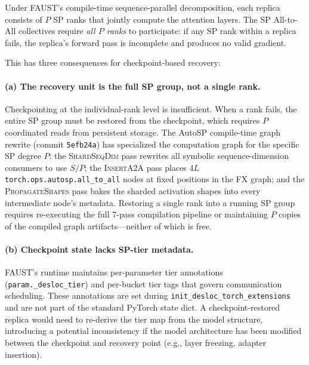 \documentclass{article}
\begin{document}
Under FAUST's compile-time sequence-parallel decomposition, each
replica consists of $P$ SP ranks that jointly compute the attention
layers. The SP All-to-All collectives require \emph{all $P$ ranks} to
participate: if any SP rank within a replica fails, the replica's
forward pass is incomplete and produces no valid gradient.

This has three consequences for checkpoint-based recovery:

\paragraph{(a) The recovery unit is the full SP group, not a single rank.}
Checkpointing at the individual-rank level is insufficient. When a rank
fails, the entire SP group must be restored from the checkpoint, which
requires $P$ coordinated reads from persistent storage. The AutoSP compile-time
graph rewrite (commit \texttt{5efb24a}) has specialized the computation graph for the specific
SP degree $P$: the \textsc{ShardSeqDim} pass rewrites all symbolic
sequence-dimension consumers to use $S/P$; the \textsc{InsertA2A} pass
places $4L$ \texttt{torch.ops.autosp.all\_to\_all} nodes at fixed
positions in the FX graph; and the \textsc{PropagateShapes} pass bakes
the sharded activation shapes into every intermediate node's metadata.
Restoring a single rank into a running SP group requires re-executing
the full 7-pass compilation pipeline or maintaining $P$ copies of
the compiled graph artifacts---neither of which is free.

\paragraph{(b) Checkpoint state lacks SP-tier metadata.}
FAUST's runtime maintains per-parameter tier annotations
(\texttt{param.\_desloc\_tier}) and per-bucket tier tags that govern
communication scheduling. These annotations are set during
\texttt{init\_desloc\_torch\_extensions} and are not part of the
standard PyTorch state dict. A checkpoint-restored replica would need
to re-derive the tier map from the model structure, introducing a
potential inconsistency if the model architecture has been modified
between the checkpoint and recovery point (e.g., layer freezing,
adapter insertion).
\end{document}
